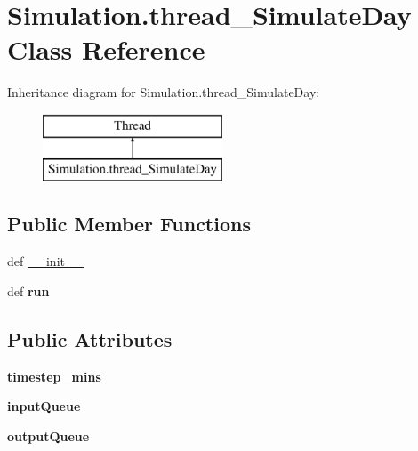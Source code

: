 \hypertarget{class_simulation_1_1thread___simulate_day}{\section{Simulation.\-thread\-\_\-\-Simulate\-Day Class Reference}
\label{class_simulation_1_1thread___simulate_day}
}
Inheritance diagram for Simulation.\-thread\-\_\-\-Simulate\-Day\-:\begin{figure}[H]
\begin{center}
\leavevmode
\includegraphics[height=2.000000cm]{class_simulation_1_1thread___simulate_day}
\end{center}
\end{figure}
\subsection*{Public Member Functions}
\begin{DoxyCompactItemize}
\item 
def \hyperlink{class_simulation_1_1thread___simulate_day_a4b5afb83ff39b3b1e1dc3a33e8fce1bc}{\-\_\-\-\_\-init\-\_\-\-\_\-}
\item 
\hypertarget{class_simulation_1_1thread___simulate_day_a428e987c870390ef2888eb4a2606db57}{def {\bfseries run}}\label{class_simulation_1_1thread___simulate_day_a428e987c870390ef2888eb4a2606db57}

\end{DoxyCompactItemize}
\subsection*{Public Attributes}
\begin{DoxyCompactItemize}
\item 
\hypertarget{class_simulation_1_1thread___simulate_day_a42d35d543ec4c611f85a996c0bc311f1}{{\bfseries timestep\-\_\-mins}}\label{class_simulation_1_1thread___simulate_day_a42d35d543ec4c611f85a996c0bc311f1}

\item 
\hypertarget{class_simulation_1_1thread___simulate_day_ad5fca71c854ba668334336d229e738bb}{{\bfseries input\-Queue}}\label{class_simulation_1_1thread___simulate_day_ad5fca71c854ba668334336d229e738bb}

\item 
\hypertarget{class_simulation_1_1thread___simulate_day_a73be72267290bdb77d7ef55fce6e68b8}{{\bfseries output\-Queue}}\label{class_simulation_1_1thread___simulate_day_a73be72267290bdb77d7ef55fce6e68b8}

\end{DoxyCompactItemize}


